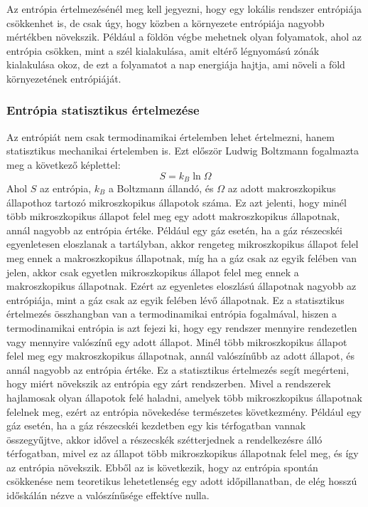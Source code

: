 \documentclass[a4paper,12pt]{article}
\begin{document}
Az entrópia értelmezésénél meg kell jegyezni, hogy egy lokális rendszer entrópiája csökkenhet is, de csak úgy, hogy közben a környezete entrópiája nagyobb mértékben növekszik. Például
a földön végbe mehetnek olyan folyamatok, ahol az entrópia csökken, mint a szél kialakulása, amit eltérő légnyomású zónák kialakulása okoz, de ezt a folyamatot a nap energiája hajtja, ami növeli a föld környezetének entrópiáját.

\subsubsection*{Entrópia statisztikus értelmezése}
Az entrópiát nem csak termodinamikai értelemben lehet értelmezni, hanem statisztikus mechanikai értelemben is. Ezt először Ludwig Boltzmann fogalmazta meg a következő képlettel:
\begin{equation}
    S = k_B \ln{\Omega}
\end{equation}
Ahol $S$ az entrópia, $k_B$ a Boltzmann állandó, és $\Omega$ az adott makroszkopikus állapothoz tartozó mikroszkopikus állapotok száma.
Ez azt jelenti, hogy minél több mikroszkopikus állapot felel meg egy adott makroszkopikus állapotnak, annál nagyobb az entrópia értéke.
Például egy gáz esetén, ha a gáz részecskéi egyenletesen eloszlanak a tartályban, akkor rengeteg mikroszkopikus állapot felel meg ennek a makroszkopikus állapotnak, míg ha a gáz csak az egyik felében van jelen, akkor csak egyetlen mikroszkopikus állapot felel meg ennek a makroszkopikus állapotnak.
Ezért az egyenletes eloszlású állapotnak nagyobb az entrópiája, mint a gáz csak az egyik felében lévő állapotnak.
\newline
\newline
Ez a statisztikus értelmezés összhangban van a termodinamikai entrópia fogalmával, hiszen a termodinamikai entrópia is azt fejezi ki, hogy egy rendszer mennyire rendezetlen vagy mennyire valószínű egy adott állapot.
Minél több mikroszkopikus állapot felel meg egy makroszkopikus állapotnak, annál valószínűbb az adott állapot, és annál nagyobb az entrópia értéke.
\newline
\newline
Ez a statisztikus értelmezés segít megérteni, hogy miért növekszik az entrópia egy zárt rendszerben. Mivel a rendszerek hajlamosak olyan állapotok felé haladni, amelyek több mikroszkopikus állapotnak felelnek meg,
ezért az entrópia növekedése természetes következmény. Például egy gáz esetén, ha a gáz részecskéi kezdetben egy kis térfogatban vannak összegyűjtve, akkor idővel a részecskék szétterjednek a rendelkezésre álló térfogatban,
mivel ez az állapot több mikroszkopikus állapotnak felel meg, és így az entrópia növekszik.
\newline
\newline
Ebből az is következik, hogy az entrópia spontán csökkenése nem teoretikus lehetetlenség egy adott időpillanatban, de elég hosszú időskálán nézve a valószínűsége effektíve nulla.
\end{document}
